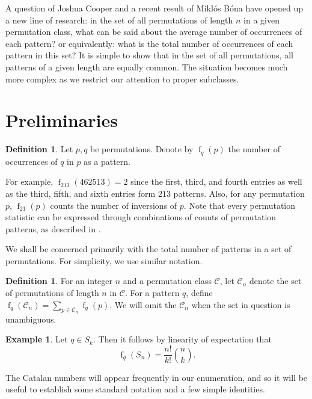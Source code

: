 \documentclass[11pt]{article} %
\theoremstyle{plain}
\theoremstyle{definition}
\newtheorem{definition}[theorem]{Definition}
\newtheorem{example}[theorem]{Example}
\DeclareMathOperator{\num}{f}
\begin{document}
  A question of Joshua Cooper and a recent result of Mikl\'os B\'ona have
  opened up a new line of research: in the set of all permutations of
  length $n$ in a given permutation class, what can be said about the
  average number of occurrences of each pattern?  or equivalently:
  what is the total number of occurrences of each pattern in this set?
  It is simple to show that in the set of all permutations, all
  patterns of a given length are equally common. The situation becomes
  much more complex as we restrict our attention to proper subclasses.


\section{Preliminaries}


  \begin{definition}
    Let $p,q$ be permutations. Denote by $\num_{q}(p)$ the number of
    occurrences of $q$ in $p$ as a pattern.
  \end{definition}

  For example, $\num_{213}(462513) = 2$ since the first, third, and
  fourth entries as well as the third, fifth, and sixth entries form
  $213$ patterns. Also, for any permutation $p$, $\num_{21}(p)$ counts
  the number of inversions of $p$. Note that every permutation
  statistic can be expressed through combinations of counts of
  permutation patterns, as described in \cite{claesson11}.

  We shall be concerned primarily with the total number of patterns in a
  set of permutations. For simplicity, we use similar notation.

  \begin{definition}
    For an integer $n$ and a permutation class $\mathcal{C}$, let
    $\mathcal{C}_n$ denote the set of permutations of length $n$ in
    $\mathcal{C}$. For a pattern $q$, define $\num_{q}(\mathcal{C}_n)=
    \sum_{p \in \mathcal{C}_n} \num_q(p)$.
    We will omit the $\mathcal{C}_n$ when the set in question is
    unambiguous.
  \end{definition}

  \begin{example} \label{linearity}
    Let $q \in S_k$. Then it follows by linearity of expectation that
    $$\num_q(S_n) = \frac{n!}{k!} \binom{n}{k}.$$
  \end{example}

  The Catalan numbers will appear frequently in our enumeration, and
  so it will be useful to establish some standard notation and a few
  simple identities.
\end{document}
